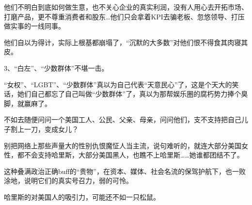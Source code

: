 \documentclass[UTF8,11pt,oneside]{ctexart}
\begin{document}
他们不明白到底如何做生意，也不关心企业的真实利润，没有人用心去开拓市场、打磨产品，更不尊重消费者和股东…他们只会拿着KPI去骗老板、忽悠领导、打压做实事的一线同事。

他们自以为得计，实际上根基都崩塌了，“沉默的大多数”对他们恨不得食其肉寝其皮。

3、“白左”、“少数群体”不堪一击。

“女权”、“LGBT”、“少数群体”真以为自己代表“天意民心”了，这是个天大的笑话，她们自己都忘了自己叫做“少数群体”了，真以为那帮娱乐圈的腐朽势力捧个臭脚，就赢麻了。

不如去随便问问一个美国工人、公民、父亲、母亲，问问他们，支不支持把自己儿子割上一刀，变成女儿？

别把网络上那些声量大的性别仇恨魔怔人当主流，说句难听的，就连大部分美国女性，都不会支持哈里斯，大部分美国黑人，也瞧不上哈里斯……她谁都团结不了。


这种叠满政治正确buff的“贵物”，在资本、媒体、社会名流的保驾护航下，也一败涂地，说明它们的真实号召力，弱的可怜。

哈里斯的对美国人的吸引力，可能还不如一只松鼠\footnotemark。
\end{document}
